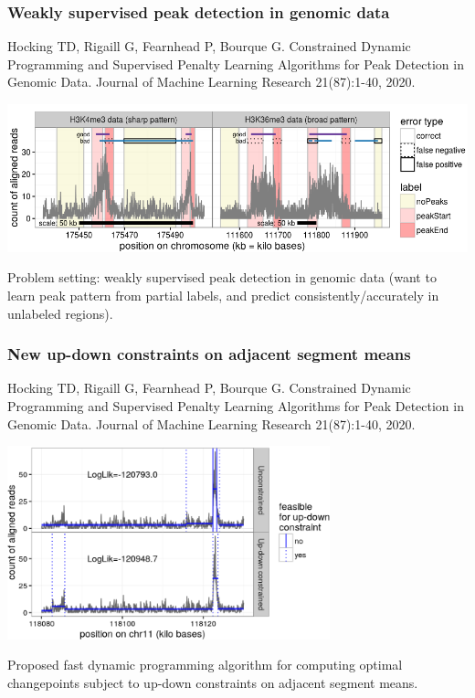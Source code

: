 \documentclass[t]{beamer}
\begin{document}
\begin{frame}
  \frametitle{Weakly supervised peak detection in genomic data}
{\scriptsize Hocking TD, Rigaill G, Fearnhead P, Bourque G. Constrained Dynamic Programming and Supervised Penalty Learning Algorithms for Peak Detection in Genomic Data. Journal of Machine Learning Research 21(87):1-40, 2020.}

  \includegraphics[width=\textwidth]{figure-Hocking2020-peak-label-errors}

  Problem setting: weakly supervised peak detection in genomic data
  (want to learn peak pattern from partial labels, and predict
  consistently/accurately in unlabeled regions).
\end{frame}

\begin{frame}
  \frametitle{New up-down constraints on adjacent segment means}
{\scriptsize Hocking TD, Rigaill G, Fearnhead P, Bourque G. Constrained Dynamic Programming and Supervised Penalty Learning Algorithms for Peak Detection in Genomic Data. Journal of Machine Learning Research 21(87):1-40, 2020.}

  \includegraphics[width=0.7\textwidth]{figure-Hocking2020-peak-constraints}

  Proposed fast dynamic programming algorithm for computing optimal
  changepoints subject to up-down constraints on adjacent segment
  means.
\end{frame}
\end{document}
